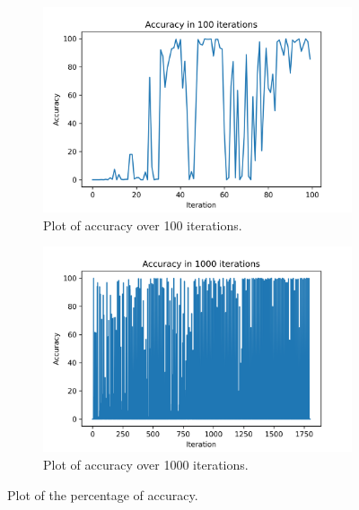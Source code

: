 \begin{figure}[!ht]
\centering
     \begin{subfigure}[b]{0.4\textwidth}
         \centering
         \includegraphics[width=\textwidth]{Images/plot_accuracy_100.png}
         \caption{Plot of accuracy over 100 iterations.}
         \label{fig:accuracy_100}
     \end{subfigure}
     \hfill
     \begin{subfigure}[b]{0.4\textwidth}
         \centering
         \includegraphics[width=\textwidth]{Images/plot_accuracy_1000.png}
         \caption{Plot of accuracy over 1000 iterations.}
         \label{fig:accuracy_1000}
     \end{subfigure}
     \hfill
        \caption{Plot of the percentage of accuracy.}
        \label{plot_accuracy}
\end{figure}


\clearpage
\newpage
\mbox{~}
\clearpage
\newpage
